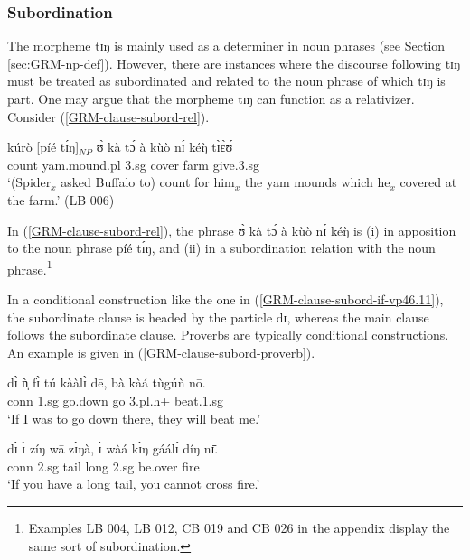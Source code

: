 \z 
 \z



\subsubsection{Subordination}
\label{GRM-clause-subord}

The morpheme {\sls tɪŋ} is mainly used as a  determiner in noun phrases  (see
Section \ref{sec:GRM-np-def}).  However, there are instances where the discourse
following {\sls tɪŋ} must be treated as subordinated and related to the noun
phrase of which  {\sls tɪŋ} is part. One may argue that the morpheme {\sls tɪŋ} 
can
function  as a relativizer. Consider (\ref{GRM-clause-subord-rel}).


\ea\label{GRM-clause-subord-rel} 
\gll  kúrò [píé tɪ́ŋ]$_{NP}$  ʊ̀ kà tɔ́ à kùò nɪ́ kéŋ̀ tɪ̀ɛ̀ʊ́\\
 count yam.mound.{\sc pl}  {\art} {\sc 3.sg} {\egr} cover {\art} farm {\postp} 
{\advm} give.{\sc 3.sg}\\
\glt  `(Spider$_{x}$ asked Buffalo to) count  for him$_{x}$ the yam mounds which
he$_{x}$ covered at the farm.' (LB 006)
 \z


In (\ref{GRM-clause-subord-rel}), the phrase {\sls ʊ̀ kà tɔ́ à kùò nɪ́
kéŋ̀} is (i) in apposition to the noun phrase {\sls píé tɪ́ŋ}, and (ii)
in a subordination relation with the noun phrase.\footnote{Examples 
LB 004, LB 012, CB 019 and  CB 026 in the appendix display the same sort of
subordination.}


In a conditional construction like the one in
(\ref{GRM-clause-subord-if-vp46.11}), the subordinate
clause is headed by the particle {\sls dɪ},  whereas the main clause follows
the subordinate clause. Proverbs are typically  conditional
constructions.  An example is given in (\ref{GRM-clause-subord-proverb}).


\ea\label{GRM-clause-subord-di}

\ea\label{GRM-clause-subord-if-vp46.11}

\gll dɪ̀ ǹ̩ fɪ̀ tú kààlɪ̀ dē, bà kàá  tùgúǹ nō.\\
   {\sc conn}  {\sc 1.sg} {\mod} {go.down} go {\adv} {\sc 3.pl.h+} {\fut}
beat.{\sc 1.sg} {\foc}\\
\glt  `If I was to go down there, they will beat me.' 

\ex\label{GRM-clause-subord-proverb}
\gll dɪ̀ ɪ̀ zíŋ wā zɪ̀ŋà,  ɪ̀ wàá kɪ̀ŋ gáálɪ́ díŋ nɪ̄.\\
  {\sc conn} {\sc 2.sg}  tail {\ingr} long  {\sc 2.sg} {\neg} {\abl} be.over
fire
{\postp}\\
`If you have a long tail, you cannot cross fire.'


